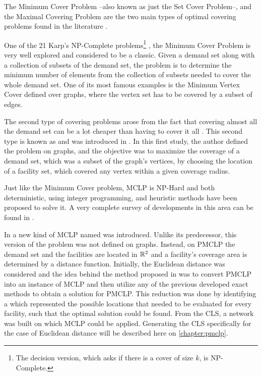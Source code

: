 The Minimum Cover Problem --also known as just the Set Cover Problem--, and the Maximal Covering Problem are the two main types of optimal covering problems found in the literature \cite{karatas}. 

One of the 21 Karp's NP-Complete problems\footnote{The decision version, which asks if there is a cover of size $k$, is NP-Complete.} \cite{karp}, the Minimum Cover Problem is very well explored and considered to be a classic. 
Given a demand set along with a collection of subsets of the demand set, the problem is to determine the minimum number of elements from the collection of subsets needed to cover the whole demand set. One of its most famous examples is the Minimum Vertex Cover defined over graphs, where the vertex set has to be covered by a subset of edges.

The second type of covering problems arose from the fact that covering almost all the demand set can be a lot cheaper than having to cover it all \cite{garcia}. This second type is known as  and was introduced in .
In this first study, the author defined the problem on graphs, and the objective was to maximize the coverage of a demand set, which was a subset of the graph's vertices, by choosing the location of a facility set, which covered any vertex within a given coverage radius.

Just like the Minimum Cover problem, MCLP is NP-Hard \cite{hatta:2013} and both deterministic, using integer programming, and heuristic methods have been proposed to solve it. A very complete survey of developments in this area can be found in .

In  a new kind of MCLP named  was introduced. Unlike its predecessor, this version of the problem was not defined on graphs. Instead, on PMCLP the demand set and the facilities are located in $\mathbb{R}^2$ and a facility's coverage area is determined by a distance function. 
Initially, the Euclidean distance was considered and the idea behind the method proposed in  was to convert PMCLP into an instance of MCLP and then utilize any of the previous developed exact methods to obtain a solution for PMCLP. This reduction was done by identifying a  which represented the possible locations that needed to be evaluated for every facility, such that the optimal solution could be found. From the CLS, a network was built on which MCLP could be applied. Generating the CLS specifically for the case of Euclidean distance will be described here on \autoref{chapter:pmclp}.

